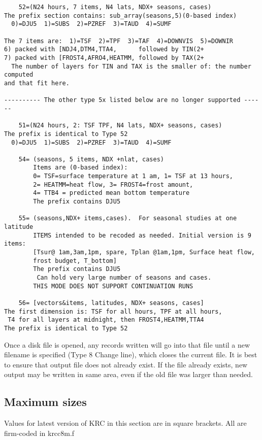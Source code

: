 \documentclass{article}
\begin{document}
\vspace{-3.mm}
\begin{verbatim}
    52=(N24 hours, 7 items, N4 lats, NDX+ seasons, cases)
The prefix section contains: sub_array(seasons,5)(0-based index)
  0)=DJU5  1)=SUBS  2)=PZREF  3)=TAUD  4)=SUMF

The 7 items are:  1)=TSF  2)=TPF  3)=TAF  4)=DOWNVIS  5)=DOWNIR
6) packed with [NDJ4,DTM4,TTA4,      followed by TIN(2+
7) packed with [FROST4,AFRO4,HEATMM, followed by TAX(2+
  The number of layers for TIN and TAX is the smaller of: the number computed 
and that fit here.

---------- The other type 5x listed below are no longer supported ------

    51=(N24 hours, 2: TSF TPF, N4 lats, NDX+ seasons, cases)
The prefix is identical to Type 52
  0)=DJU5  1)=SUBS  2)=PZREF  3)=TAUD  4)=SUMF

    54= (seasons, 5 items, NDX +nlat, cases)
        Items are (0-based index): 
        0= TSF=surface temperature at 1 am, 1= TSF at 13 hours,
        2= HEATMM=heat flow, 3= FROST4=frost amount, 
        4= TTB4 = predicted mean bottom temperature
        The prefix contains DJU5 

    55= (seasons,NDX+ items,cases).  For seasonal studies at one latitude
        ITEMS intended to be recoded as needed. Initial version is 9 items:
        [Tsur@ 1am,3am,1pm, spare, Tplan @1am,1pm, Surface heat flow,
        frost budget, T_bottom]
        The prefix contains DJU5        
         Can hold very large number of seasons and cases. 
        THIS MODE DOES NOT SUPPORT CONTINUATION RUNS

    56= [vectors&items, latitudes, NDX+ seasons, cases]
The first dimension is: TSF for all hours, TPF at all hours, 
 T4 for all layers at midnight, then FROST4,HEATMM,TTA4
The prefix is identical to Type 52
\end{verbatim}
Once a disk file is opened, any records written will go into that file until a
new filename is specified (Type 8 Change line), which closes the current file.
It is best to ensure that output file does not already exist. If the file
already exists, new output may be written in same area, even if the old file was
larger than needed.

\subsection{Maximum sizes} %
Values for latest version of KRC in this section are in square brackets. All are
firm-coded in krcc8m.f
\end{document}
